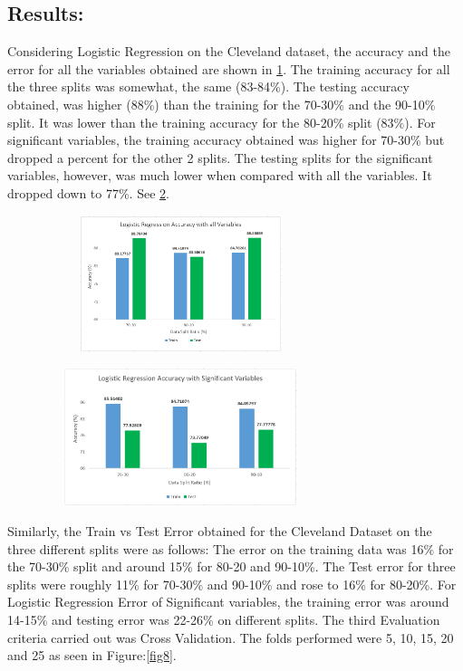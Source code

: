 \documentclass[conference]{IEEEtran}
\begin{document}
\subsection{Results:}

Considering Logistic Regression on the Cleveland dataset, the accuracy and the error for all the variables obtained are shown in \ref{fig4}. The training accuracy for all the three splits was somewhat, the same (83-84\%). The testing accuracy obtained, was higher (88\%) than the training for the 70-30\% and the 90-10\% split. It was lower than the training accuracy for the 80-20\% split (83\%). For significant variables, the training accuracy obtained was higher for 70-30\% but dropped a percent for the other 2 splits. The testing splits for the significant variables, however, was much lower when compared with all the variables. It dropped down to 77\%. See \ref{fig5}. \\

\begin{figure}
	\centering
	\includegraphics[height=4cm, width=8cm]{images/Fig4}
	\linebreak
	\label{fig4}
\end{figure}

\begin{figure}
	\centering
	\includegraphics[height=4cm, width=8cm]{images/Fig5}
	\linebreak
	\label{fig5}
\end{figure}


 Similarly, the Train vs Test Error obtained for the Cleveland Dataset on the three different splits were as follows: The error on the training data was 16\% for the 70-30\% split and around 15\% for 80-20 and 90-10\%. The Test error for three splits were roughly 11\% for 70-30\% and 90-10\% and rose to 16\% for 80-20\%. For Logistic Regression Error of Significant variables, the training error was around 14-15\% and testing error was 22-26\% on different splits. The third Evaluation criteria carried out was Cross Validation. The folds performed were 5, 10, 15, 20 and 25 as seen in Figure:\ref{fig8}.
 
\end{document}
